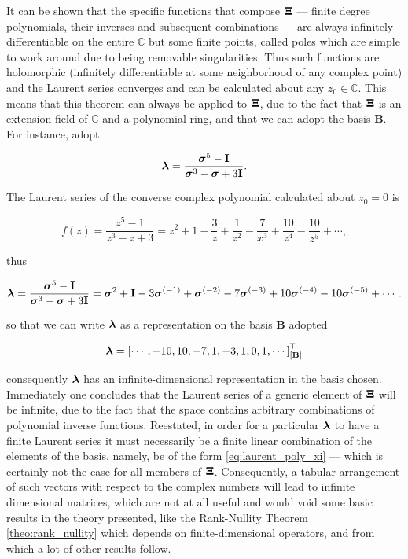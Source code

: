 	It can be shown that the specific functions that compose $\boldsymbol{\Xi}$ — finite degree polynomials, their inverses and subsequent combinations — are always infinitely differentiable on the entire $\mathbb{C}$ but some finite points, called poles  which are simple to work around due to being removable singularities. Thus such functions are holomorphic (infinitely differentiable at some neighborhood of any complex point) and the Laurent series converges and can be calculated about any $z_0\in\mathbb{C}$. This means that this theorem can always be applied to $\boldsymbol{\Xi}$, due to the fact that $\boldsymbol{\Xi}$ is an extension field of $\mathbb{C}$ and a polynomial ring, and that we can adopt the basis $\mathbf{B}$. For instance, adopt

\begin{equation} \boldsymbol{\lambda} = \dfrac{\boldsymbol{\sigma}^{5} - \mathbf{I}}{\boldsymbol{\sigma}^{3} - \boldsymbol{\sigma} + 3\mathbf{I}} .\end{equation}

	The Laurent series of the converse complex polynomial calculated about $z_0 = 0$ is

\begin{equation} f(z) = \dfrac{z^5 - 1}{z^3 - z + 3} = z^2 + 1 - \dfrac{3}{z} + \dfrac{1}{z^2} - \dfrac{7}{x^3} + \dfrac{10}{z^4} - \dfrac{10}{z^5} + \cdots ,\end{equation}

	\noindent thus

\begin{equation} \boldsymbol{\lambda} = \dfrac{\boldsymbol{\sigma}^{5} - \mathbf{I}}{\boldsymbol{\sigma}^{3} - \boldsymbol{\sigma} + 3\mathbf{I}} = \boldsymbol{\sigma}^{2} + \mathbf{I} - 3\boldsymbol{\sigma}^{(-1)} + \boldsymbol{\sigma}^{(-2)} - 7\boldsymbol{\sigma}^{(-3)} + 10\boldsymbol{\sigma}^{(-4)} - 10\boldsymbol{\sigma}^{(-5)} + \cdots .\end{equation}

	\noindent so that we can write $\boldsymbol{\lambda}$ as a representation on the basis $\mathbf{B}$ adopted

\begin{equation} \boldsymbol{\lambda} = \left[\cdots , -10 ,  10 ,  -7 ,  1 ,  -3 ,  1 ,  0 ,  1 , \cdots \right]^{\mathsf{T}}_{\left[\mathbf{B}\right]} \end{equation}

	\noindent consequently $\boldsymbol{\lambda}$ has an infinite-dimensional representation in the basis chosen. Immediately one concludes that the Laurent series of a generic element of $\boldsymbol{\Xi}$ will be infinite, due to the fact that the space contains arbitrary combinations of polynomial inverse functions. Reestated, in order for a particular $\boldsymbol{\lambda}$ to have a finite Laurent series it must necessarily be a finite linear combination of the elements of the basis, namely, be of the form \eqref{eq:laurent_poly_xi} — which is certainly not the case for all members of $\boldsymbol{\Xi}$. Consequently, a tabular arrangement of such vectors with respect to the complex numbers will lead to infinite dimensional matrices, which are not at all useful and would void some basic results in the theory presented, like the Rank-Nullity Theorem \ref{theo:rank_nullity} which depends on finite-dimensional operators, and from which a lot of other results follow.

